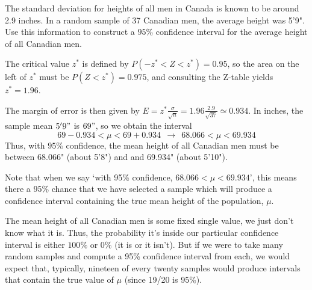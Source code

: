 \begin{example} 
The standard deviation for heights of all men in Canada is known to be around 2.9 inches. In a random sample of 37 Canadian men, the average height was 5'9". Use this information to construct a $95\%$ confidence interval for the average height of all Canadian men.
\par
\noindent The critical value $z^*$ is defined by $P(-z^* < Z < z^*) = 0.95$, so the area on the left of $z^*$ must be $P(Z < z^*) = 0.975$, and consulting the Z-table yields $z^* = 1.96$.
\begin{center}
\end{center}
\noindent The margin of error is then given by $E = z^*  \frac{\sigma}{\sqrt{n}} = 1.96  \frac{2.9}{\sqrt{37}} \simeq 0.934$. In inches, the sample mean $5'9"$ is $69"$, so we obtain the interval 
$$69-0.934 < \mu < 69+0.934 \ \ \rightarrow \ \ 68.066 < \mu < 69.934$$
\noindent Thus, with $95\%$ confidence, the mean height of all Canadian men must be between 68.066" (about 5'8") and and 69.934" (about 5'10").
\end{example}
\par
Note that when we say `with 95\% confidence, $68.066 < \mu < 69.934$', this means there a 95\% chance that we have selected a sample which will produce a confidence interval containing the true mean height of the population, $\mu$.
\par
The mean height of all Canadian men is some fixed single value, we just don't know what it is. Thus, the probability it's inside our particular confidence interval is either $100\%$ or $0\%$ (it is or it isn't). But if we were to take many random samples and compute a 95\% confidence interval from each, we would expect that, typically, nineteen of every twenty samples would produce intervals that contain the true value of $\mu$ (since 19/20 is 95\%).

